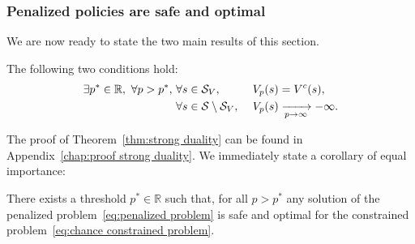 \subsubsection{Penalized policies are safe and optimal}
We are now ready to state the two main results of this section.
\begin{theorem} \label{thm:strong duality}
	The following two conditions hold:
	\begin{alignat}{3}
		\exists p^*\in\mathbb{R},~\forall p > p^*,~&\forall s\in{\ensuremath{\mathcal{S}}_{V}},&~&V_p(s) = V^c(s),\label{eq:strong duality sv}\\
		&\forall s\in\mathcal{S}\setminus{\ensuremath{\mathcal{S}}_{V}},&~&V_p(s)\xrightarrow[p\to\infty]{}-\infty. \label{eq:strong duality su}
	\end{alignat}
\end{theorem}
The proof of Theorem~\ref{thm:strong duality} can be found in Appendix~\ref{chap:proof strong duality}. We immediately state a corollary of equal importance:
\begin{corollary} \label{clry:penalized solves constrained}
	There exists a threshold $p^*\in\mathbb{R}$ such that, for all $p > p^*$ any solution of the penalized problem~\eqref{eq:penalized problem} is safe and optimal for the constrained problem~\eqref{eq:chance constrained problem}.
\end{corollary}
